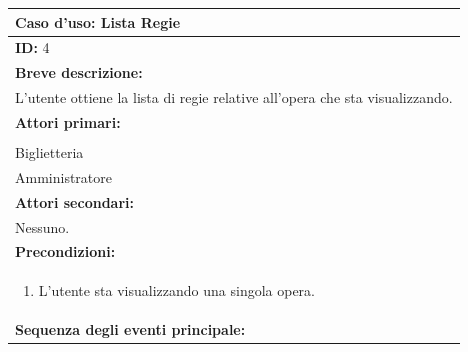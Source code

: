 \documentclass{article}
\begin{document}
                \begin{table}[H]
                    \begin{tabular}{|p{\linewidth}|}
                        \hline
                        \cellcolor{gray!100}
                        \color{white}
                        \centerline{\textbf{Caso d'uso:} Lista Regie} \\
                        \hline
                        \textbf{ID:} 4 \\
                        \hline
                        \cellcolor{gray!20}
                        \textbf{Breve descrizione:} \\
                        \cellcolor{gray!20}
                        L'utente ottiene la lista di regie relative all'opera che sta visualizzando. \\
                        \hline
                        \textbf{Attori primari:} \\
                        \begin{minipage}{\linewidth}
                            Cliente \\
                            Biglietteria \\
                            Amministratore
                        \end{minipage}
                        \vspace{0pt} \\  %
                        \hline
                        \textbf{Attori secondari:} \\
                        Nessuno. \\
                        \hline
                        \cellcolor{gray!20}
                        \textbf{Precondizioni:} \\
                        \cellcolor{gray!20}
                        \begin{minipage}{\linewidth}
                            \begin{enumerate}
                                \item L'utente sta visualizzando una singola opera.
                            \end{enumerate}
                        \end{minipage} \\
                        \hline
                        \textbf{Sequenza degli eventi principale:}

\end{tabular}
\end{table}
\end{document}
